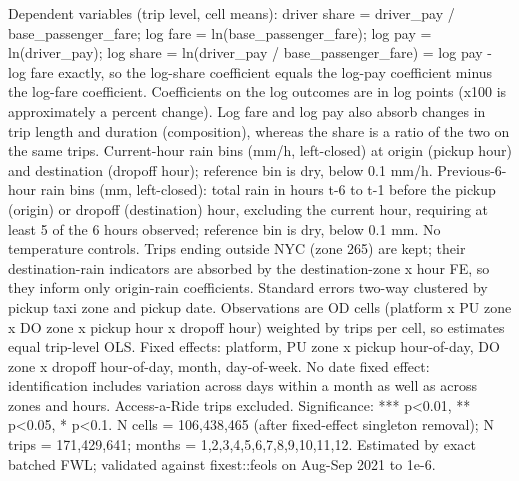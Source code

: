 \par \raggedright 
Dependent variables (trip level, cell means): driver share = driver\_pay / base\_passenger\_fare; log fare = ln(base\_passenger\_fare); log pay = ln(driver\_pay); log share = ln(driver\_pay / base\_passenger\_fare) = log pay - log fare exactly, so the log-share coefficient equals the log-pay coefficient minus the log-fare coefficient. Coefficients on the log outcomes are in log points (x100 is approximately a percent change). Log fare and log pay also absorb changes in trip length and duration (composition), whereas the share is a ratio of the two on the same trips. Current-hour rain bins (mm/h, left-closed) at origin (pickup hour) and destination (dropoff hour); reference bin is dry, below 0.1 mm/h. Previous-6-hour rain bins (mm, left-closed): total rain in hours t-6 to t-1 before the pickup (origin) or dropoff (destination) hour, excluding the current hour, requiring at least 5 of the 6 hours observed; reference bin is dry, below 0.1 mm. No temperature controls. Trips ending outside NYC (zone 265) are kept; their destination-rain indicators are absorbed by the destination-zone x hour FE, so they inform only origin-rain coefficients. Standard errors two-way clustered by pickup taxi zone and pickup date. Observations are OD cells (platform x PU zone x DO zone x pickup hour x dropoff hour) weighted by trips per cell, so estimates equal trip-level OLS. Fixed effects: platform, PU zone x pickup hour-of-day, DO zone x dropoff hour-of-day, month, day-of-week. No date fixed effect: identification includes variation across days within a month as well as across zones and hours. Access-a-Ride trips excluded. Significance: *** p<0.01, ** p<0.05, * p<0.1. N cells = 106,438,465 (after fixed-effect singleton removal); N trips = 171,429,641; months = 1,2,3,4,5,6,7,8,9,10,11,12. Estimated by exact batched FWL; validated against fixest::feols on Aug-Sep 2021 to 1e-6.
\par\endgroup
\ifdefined\ifclassloaded
{}
\fi
